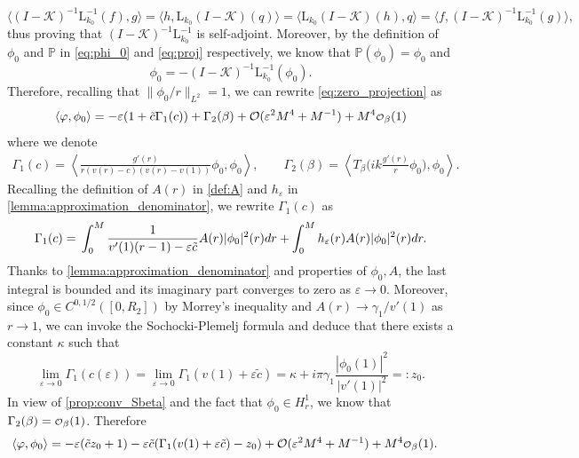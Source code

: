 \documentclass[11pt,reqno]{amsproc}
\def\dd{{\rm d}}
\def\eps{\varepsilon}
\newcommand{\rmL}{\mathrm{L}}
\newcommand{\cK}{\mathcal{K}}
\newcommand\smallO{
  \mathchoice
    {{\scriptstyle\mathcal{O}}}%
    {{\scriptstyle\mathcal{O}}}%
    {{\scriptscriptstyle\mathcal{O}}}%
    {\scalebox{.7}{$\scriptscriptstyle\mathcal{O}$}}%
  }
\theoremstyle{definition}
\theoremstyle{definition}
\numberwithin{equation}{section}
\begin{document}
\begin{equation}
    \langle (I-\cK)^{-1}\rmL_{k_0}^{-1} (f),g\rangle =\langle h,\rmL_{k_0}(I-\cK)(q)\rangle=\langle \rmL_{k_0}(I-\cK) (h),q\rangle=\langle  f,(I-\cK)^{-1}\rmL_{k_0}^{-1}(g)\rangle,
\end{equation}
thus proving that $(I-\cK)^{-1}\rmL_{k_0}^{-1}$ is self-adjoint. Moreover, by the definition of $\phi_0$ and $\mathbb{P}$ in \cref{eq:phi_0} and \cref{eq:proj} respectively, we know that $\mathbb{P}(\phi_0)=\phi_0$ and 
\[
\phi_0=-(I-\cK)^{-1}\rmL_{k_0}^{-1}(\phi_0).
\]
Therefore, recalling that $\|\phi_0/r\|_{L^2}=1$, we can rewrite \cref{eq:zero_projection} as 
\begin{equation}
    \langle \varphi,\phi_0\rangle =-\eps(1+\tilde{c}\Gamma_1(c))+\Gamma_2(\beta)+\mathcal{O}(\eps^2 M^4+M^{-1})+ M^4\smallO_\beta(1)
\end{equation}
where we denote 
\begin{align}
    \Gamma_1(c)=\left\langle \frac{g'(r)}{r(v(r)-c)(v(r)-v(1))}\phi_0,\phi_0 \right\rangle, \qquad \Gamma_2(\beta)=\left\langle T_\beta\big ( ik \frac{g'(r)}{r}\phi_0\big),\phi_0 \right\rangle.
\end{align}
Recalling the definition of $A(r)$ in \cref{def:A} and $h_\eps$ in \cref{lemma:approximation_denominator}, we rewrite $\Gamma_1(c)$  as 
\begin{align}
    \Gamma_1(c)=\, \int_{0}^{M}\frac{1}{v'(1)(r-1)-\eps \tilde c}A(r)|\phi_0|^2(r)\dd r+\int_0^{M}h_\eps(r)A(r)|\phi_0|^2(r)\dd r.
\end{align}
Thanks to \cref{lemma:approximation_denominator} and properties of $\phi_0, A$, the last integral is bounded and its imaginary part converges to zero as $\eps\to 0$. Moreover, since $\phi_0\in C^{0,1/2}([0,R_2])$ by Morrey's inequality and $A(r)\to \gamma_1/v'(1)$ as $r\to 1$, we can invoke the Sochocki-Plemelj formula and deduce that there exists a constant $\kappa$ such that 
\begin{equation}
    \lim_{\eps\to 0} \Gamma_1(c(\eps))= \lim_{\eps\to 0} \Gamma_1(v(1)+\eps \tilde c)=\kappa+i\pi \gamma_1\frac{|\phi_0(1)|^2}{|v'(1)|^2}=:z_0.
\end{equation}
In view of \cref{prop:conv_Sbeta} and the fact that $\phi_0\in H^1_r$, we know that $\Gamma_2(\beta)=\smallO_\beta(1)$.
Therefore
\begin{align}
        \langle \varphi,\phi_0\rangle&=-\eps (\tilde c z_0+1)-\eps \tilde c (\Gamma_1(v(1)+\eps\tilde c)-z_0)+\mathcal{O}(\eps^2 M^4+M^{-1})+ M^4\smallO_\beta(1).
\end{align}
\end{document}
